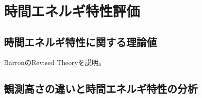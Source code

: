 \chapter{時間エネルギ特性評価}
\section{時間エネルギ特性に関する理論値}
BarronのRevised Theoryを説明。
\section{観測高さの違いと時間エネルギ特性の分析}
